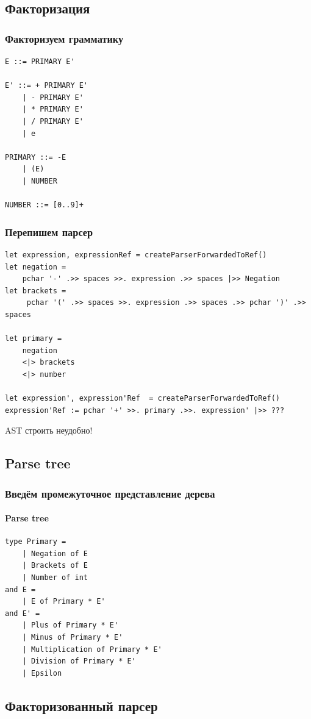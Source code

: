 \documentclass{../../slides-style}
\begin{document}
    \subsection{Факторизация}

    \begin{frame}[fragile]
        \frametitle{Факторизуем грамматику}
        \begin{verbatim}
E ::= PRIMARY E'

E' ::= + PRIMARY E'
    | - PRIMARY E'
    | * PRIMARY E'
    | / PRIMARY E'
    | e

PRIMARY ::= -E
    | (E)
    | NUMBER

NUMBER ::= [0..9]+
        \end{verbatim}
    \end{frame}

    \begin{frame}[fragile]
        \frametitle{Перепишем парсер}
        \begin{verbatim}
let expression, expressionRef = createParserForwardedToRef()
let negation = 
    pchar '-' .>> spaces >>. expression .>> spaces |>> Negation
let brackets =
     pchar '(' .>> spaces >>. expression .>> spaces .>> pchar ')' .>> spaces 

let primary = 
    negation
    <|> brackets
    <|> number

let expression', expression'Ref  = createParserForwardedToRef()
expression'Ref := pchar '+' >>. primary .>>. expression' |>> ???
        \end{verbatim}
        AST строить неудобно!
    \end{frame}

    \subsection{Parse tree}

    \begin{frame}[fragile]
        \frametitle{Введём промежуточное представление дерева}
        \framesubtitle{Parse tree}
        \begin{verbatim}
type Primary =
    | Negation of E
    | Brackets of E
    | Number of int
and E = 
    | E of Primary * E'
and E' =
    | Plus of Primary * E'
    | Minus of Primary * E'
    | Multiplication of Primary * E'
    | Division of Primary * E'
    | Epsilon
        \end{verbatim}
    \end{frame}

    \subsection{Факторизованный парсер}
\end{document}
